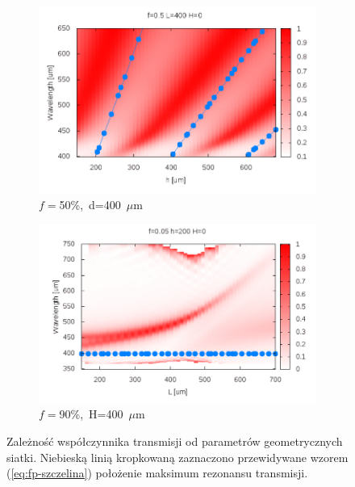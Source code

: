 \begin{figure}[tb]
\begin{subfigure}{0.45\textwidth}
	\includegraphics[width=\textwidth]{images/antenaThz/rezonant_trans_f05.png}
	\caption{$f=$50\%,~d=400~$\mu$m }
	\label{fig:rezof05}
\end{subfigure}
\begin{subfigure}{0.45\textwidth}
	\includegraphics[width=\textwidth]{images/antenaThz/rez_trans_L.png}
	\caption{$f=$90\%,~H=400~$\mu$m}
	\label{fig:rezL}
\end{subfigure}

\caption{Zależność współczynnika transmisji od parametrów geometrycznych siatki. Niebieską linią kropkowaną zaznaczono przewidywane wzorem (\ref{eq:fp-szczelina}) położenie maksimum rezonansu transmisji. }
\label{fig:rezo-siat-H}
\end{figure}


